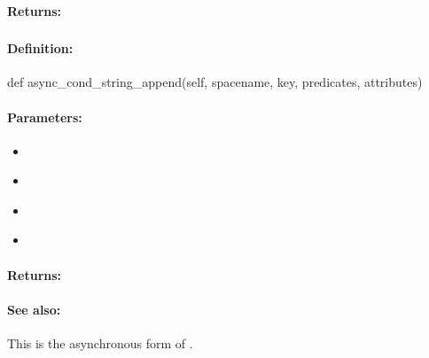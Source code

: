 \paragraph{Returns:}


\pagebreak
\subsubsection{}
\label{api:python:async_cond_string_append}


\paragraph{Definition:}
\begin{pythoncode}
def async_cond_string_append(self, spacename, key, predicates, attributes)
\end{pythoncode}

\paragraph{Parameters:}
\begin{itemize}[noitemsep]
\item {}\\

\item {}\\

\item {}\\

\item {}\\

\end{itemize}

\paragraph{Returns:}


\paragraph{See also:}  This is the asynchronous form of .

